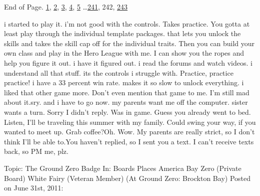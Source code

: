 End of Page.   \underline{1}, \underline{2}, \underline{3}, \underline{4}, \underline{5} \ldots \underline{241}, 242, \underline{243}



\blacksquare






 i started to play it. i'm not good with the controls. Takes practice.  You gotta at least play through the individual template packages.  that lets you unlock the skills and takes the skill cap off for the individual traits.  Then you can build your own class and play in the Hero League with me.  I can show you the ropes and help you figure it out. i have it figured out.  i read the forums and watch videos.  i understand all that stuff. its the controls i struggle with. Practice, practice practice! i have a 33 percent win rate.  makes it so slow to unlock everything.  i liked that other game more. Don't even mention that game to me.  I'm still mad about it.\strong{ }sry. and i have to go now.  my parents want me off the computer. sister wants a turn.   Sorry I didn't reply.  Was in game.  Guess you already went to bed.  Listen, I'll be traveling this summer with my family.  Could swing your way, if you wanted to meet up.  Grab coffee?Oh.  Wow.  My parents are really strict, so I don't think I'll be able to.You haven't replied, so I sent you a text.  I can't receive texts back, so PM me, plz.



\blacksquare



\blacklozenge  Topic:  The Ground Zero Badge
In:  Boards \blacktriangleright Places \blacktriangleright America \blacktrianglerightBrockton Bay \blacktrianglerightGround Zero (Private Board)
White Fairy (Veteran Member) (At Ground Zero: Brockton Bay)
Posted on June 31st, 2011:



